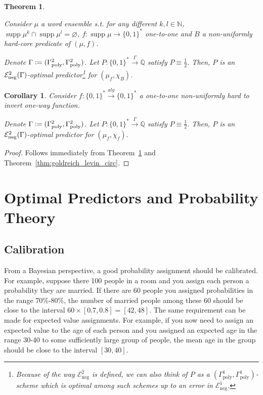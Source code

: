 \documentclass{article}
\theoremstyle{definition}
\theoremstyle{plain}
\newtheorem{theorem}{Theorem}[section]
\newtheorem{corollary}{Corollary}[section]
\newcommand{\Words}{{\{ 0, 1 \}^*}}
\DeclareMathOperator{\Supp}{supp}
\newcommand{\Nats}{\mathbb{N}}
\newcommand{\Rats}{\mathbb{Q}}
\begin{document}
\begin{theorem}
\label{thm:hard_core_circ}

Consider $\mu$ a word ensemble s.t. for any different $k,l \in \Nats$, $\Supp \mu^k \cap \Supp \mu^l = \varnothing$, $f: \Supp \mu \rightarrow \Words$ one-to-one and $B$ a non-uniformly hard-core predicate of $(\mu,f)$. 

Denote $\Gamma:=(\Gamma_{\textnormal{poly}}^2,\Gamma_{\textnormal{poly}}^2)$. Let $P: \Words \xrightarrow{\Gamma} \Rats$ satisfy $P \equiv \frac{1}{2}$. Then, $P$ is an $\mathcal{E}_{\textnormal{neg}}^2(\Gamma)$-optimal predictor\footnote{Because of the way $\mathcal{E}_{\text{neg}}^2$ is defined, we can also think of $P$ as a $(\Gamma_{\text{poly}}^1,\Gamma_{\text{poly}}^1)$-scheme which is optimal among such schemes up to an error in $\mathcal{E}_{\text{neg}}^1$.} for $(\mu_f, \chi_B)$.

\end{theorem}

\begin{corollary}

Consider $f: \Words \xrightarrow{alg} \Words$ a one-to-one non-uniformly hard to invert one-way function.

Denote $\Gamma:=(\Gamma_{\textnormal{poly}}^2,\Gamma_{\textnormal{poly}}^2)$. Let $P: \Words \xrightarrow{\Gamma} \Rats$ satisfy $P \equiv \frac{1}{2}$. Then, $P$ is an $\mathcal{E}_{\textnormal{neg}}^2(\Gamma)$-optimal predictor for $(\mu_f, \chi_f)$.

\end{corollary}

\begin{proof}

Follows immediately from Theorem~\ref{thm:hard_core_circ} and Theorem~\ref{thm:goldreich_levin_circ}.

\end{proof}

\section{Optimal Predictors and Probability Theory}
\label{sec:probability}

\subsection{Calibration}

From a Bayesian perspective, a good probability assignment should be calibrated. For example, suppose there 100 people in a room and you assign each person a probability they are married. If there are 60 people you assigned probabilities in the range 70\%-80\%, the number of married people among these 60 should be close to the interval $60 \times [0.7, 0.8] = [42,48]$. The same requirement can be made for expected value assignments. For example, if you now need to assign an expected value to the age of each person and you assigned an expected age in the range 30-40 to some sufficiently large group of people, the mean age in the group should be close to the interval $[30,40]$. 
\end{document}
